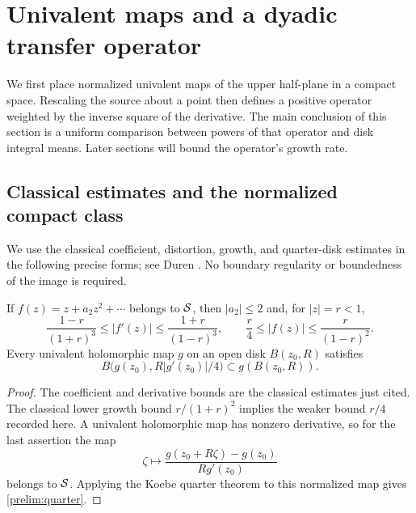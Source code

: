 \section{Univalent maps and a dyadic transfer operator}
\label{sec:preliminaries}

We first place normalized univalent maps of the upper half-plane in a
compact space.  Rescaling the source about a point then defines a positive
operator weighted by the inverse square of the derivative.  The main
conclusion of this section is a uniform comparison between powers of that
operator and disk integral means.  Later sections will bound the operator's
growth rate.

\subsection{Classical estimates and the normalized compact class}

We use the classical coefficient, distortion, growth, and quarter-disk
estimates in the following precise forms; see Duren
\cite[Chapter~2, especially \S2.3]{Duren1983}. No boundary regularity
or boundedness of the image is required.

\begin{lemma}
\label{lem:classical-univalence}
If $f(z)=z+a_2z^2+\cdots$ belongs to $\mathcal S$, then $|a_2|\le2$ and,
for $|z|=r<1$,
\begin{equation}
 \frac{1-r}{(1+r)^3}\le |f'(z)|\le\frac{1+r}{(1-r)^3},
 \qquad \frac r4\le |f(z)|\le\frac{r}{(1-r)^2}.
 \label{prelim:disk-bounds}
\end{equation}
Every univalent holomorphic map $g$ on an open disk $B(z_0,R)$ satisfies
\begin{equation}
 B\bigl(g(z_0),R|g'(z_0)|/4\bigr)\subset g(B(z_0,R)).
 \label{prelim:quarter}
\end{equation}
\end{lemma}

\begin{proof}
The coefficient and derivative bounds are the classical estimates just
cited. The classical lower growth bound $r/(1+r)^2$ implies the weaker
bound $r/4$ recorded here. A univalent holomorphic map has nonzero
derivative, so for the last assertion the map
\[
 \zeta\longmapsto
 \frac{g(z_0+R\zeta)-g(z_0)}{R g'(z_0)}
\]
belongs to $\mathcal S$. Applying the Koebe quarter theorem to this normalized
map gives \eqref{prelim:quarter}.
\end{proof}

